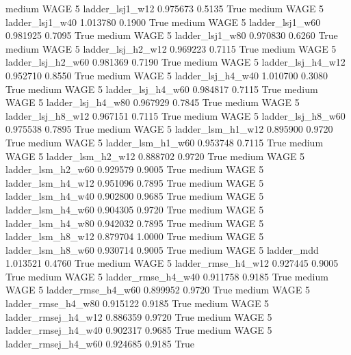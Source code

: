     medium     WAGE                 5     ladder_lsj1_w12   0.975673      0.5135    True
    medium     WAGE                 5     ladder_lsj1_w40   1.013780      0.1900    True
    medium     WAGE                 5     ladder_lsj1_w60   0.981925      0.7095    True
    medium     WAGE                 5     ladder_lsj1_w80   0.970830      0.6260    True
    medium     WAGE                 5   ladder_lsj_h2_w12   0.969223      0.7115    True
    medium     WAGE                 5   ladder_lsj_h2_w60   0.981369      0.7190    True
    medium     WAGE                 5   ladder_lsj_h4_w12   0.952710      0.8550    True
    medium     WAGE                 5   ladder_lsj_h4_w40   1.010700      0.3080    True
    medium     WAGE                 5   ladder_lsj_h4_w60   0.984817      0.7115    True
    medium     WAGE                 5   ladder_lsj_h4_w80   0.967929      0.7845    True
    medium     WAGE                 5   ladder_lsj_h8_w12   0.967151      0.7115    True
    medium     WAGE                 5   ladder_lsj_h8_w60   0.975538      0.7895    True
    medium     WAGE                 5   ladder_lsm_h1_w12   0.895900      0.9720    True
    medium     WAGE                 5   ladder_lsm_h1_w60   0.953748      0.7115    True
    medium     WAGE                 5   ladder_lsm_h2_w12   0.888702      0.9720    True
    medium     WAGE                 5   ladder_lsm_h2_w60   0.929579      0.9005    True
    medium     WAGE                 5   ladder_lsm_h4_w12   0.951096      0.7895    True
    medium     WAGE                 5   ladder_lsm_h4_w40   0.902800      0.9685    True
    medium     WAGE                 5   ladder_lsm_h4_w60   0.904305      0.9720    True
    medium     WAGE                 5   ladder_lsm_h4_w80   0.942032      0.7895    True
    medium     WAGE                 5   ladder_lsm_h8_w12   0.879704      1.0000    True
    medium     WAGE                 5   ladder_lsm_h8_w60   0.930714      0.9005    True
    medium     WAGE                 5          ladder_mdd   1.013521      0.4760    True
    medium     WAGE                 5  ladder_rmse_h4_w12   0.927445      0.9005    True
    medium     WAGE                 5  ladder_rmse_h4_w40   0.911758      0.9185    True
    medium     WAGE                 5  ladder_rmse_h4_w60   0.899952      0.9720    True
    medium     WAGE                 5  ladder_rmse_h4_w80   0.915122      0.9185    True
    medium     WAGE                 5 ladder_rmsej_h4_w12   0.886359      0.9720    True
    medium     WAGE                 5 ladder_rmsej_h4_w40   0.902317      0.9685    True
    medium     WAGE                 5 ladder_rmsej_h4_w60   0.924685      0.9185    True
